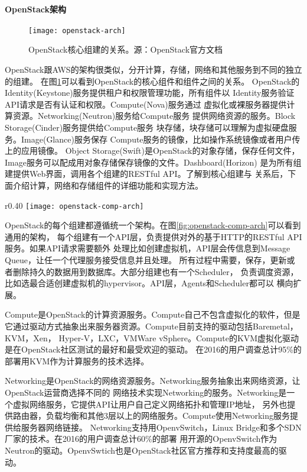 \paragraph{OpenStack架构}
\begin{figure}
  \centering
    \texttt{[image: openstack-arch]}
    \caption{OpenStack核心组建的关系。源：OpenStack官方文档}
  \label{fig:openstack-arch}
\end{figure}
OpenStack跟AWS的架构很类似，分开计算，存储，网络和其他服务到不同的独立的组建。
在图\ref{fig:openstack-arch}可以看到OpenStack的核心组件和组件之间的关系。
OpenStack的Identity(Keystone)服务提供租户和权限管理功能，所有组件以
Identity服务验证API请求是否有认证和权限。Compute(Nova)服务通过
虚拟化或裸服务器提供计算资源。Networking(Neutron)服务给Compute服务
提供网络资源的服务。Block Storage(Cinder)服务提供给Compute服务
块存储，块存储可以理解为虚拟硬盘服务。Image(Glance)服务保存
Compute服务的镜像，比如操作系统镜像或者用户传上的应用镜像。
Object Storage(Swift)是OpenStack的对象存储，保存任何文件，
Image服务可以配成用对象存储保存镜像的文件。Dashboard(Horizon)
是为所有组建提供Web界面，调用各个组建的RESTful API。了解到核心组建与
关系后，下面介绍计算，网络和存储组件的详细功能和实现方法。

\begin{wrapfigure}{r}{0.40\textwidth}
  \centering
    \texttt{[image: openstack-comp-arch]}
    \caption{OpenStack组建通用架构}
  \label{fig:openstack-comp-arch}
\end{wrapfigure}
OpenStack的每个组建都遵循统一个架构。在图\ref{fig:openstack-comp-arch}可以看到通用的架构，
每个组建有一个API层，负责提供对外的基于HTTP的RESTful API服务。如果API请求需要额外
处理比如创建虚拟机，API层会传信息到Message Queue，让任一个代理服务接受信息并且处理。
所有过程中需要，保存，更新或者删除持久的数据用到数据库。大部分组建也有一个Scheduler，
负责调度资源，比如选最合适创建虚拟机的hypervisor。API层，Agents和Scheduler都可以
横向扩展。

Compute是OpenStack的计算资源服务。Compute自己不包含虚拟化的软件，但是
它通过驱动方式抽象出来服务器资源。Compute目前支持的驱动包括Baremetal，KVM，Xen，
Hyper-V，LXC，VMWare vSphere。Compute的KVM虚拟化驱动是在OpenStack社区测试的最好和最受欢迎的驱动。
在2016的用户调查总计95\%的部署用KVM作为计算服务的技术选择。

Networking是OpenStack的网络资源服务。Networking服务抽象出来网络资源，让OpenStack运营商选择不同的
网络技术实现Networking的服务。Networking是一个虚拟网络服务，它提供API让用户自己定义网络拓扑和管理IP地址，
另外也提供路由器，负载均衡和其他3层以上的网络服务。Compute使用Networking服务提供给服务器网络链接。
Networking支持用OpenvSwitch，Linux Bridge和多个SDN厂家的技术。在2016的用户调查总计60\%的部署
用开源的OpenvSwitch作为Neutron的驱动。OpenvSwtich也是OpenStack社区官方推荐和支持度最高的驱动。

